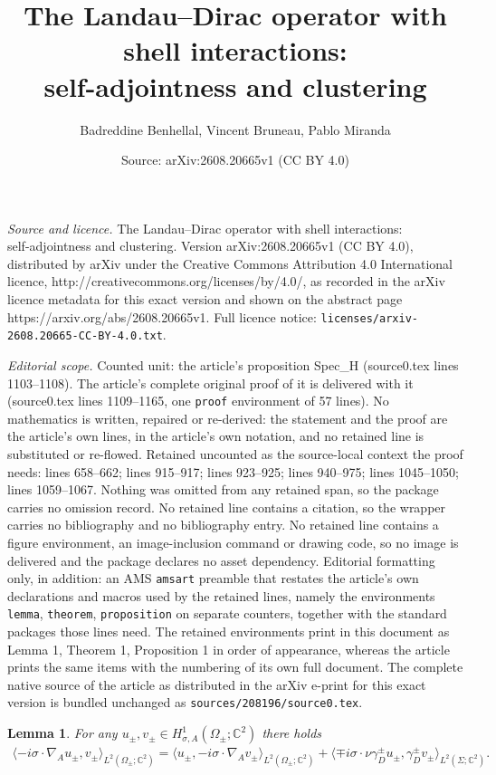 \documentclass[10pt,a4paper]{amsart}
\title{The Landau--Dirac operator with shell interactions: \\self-adjointness and clustering}
\author{Badreddine Benhellal, Vincent Bruneau, Pablo Miranda}
\date{Source: arXiv:2608.20665v1 (CC BY 4.0)}
\newtheorem{lemma}{Lemma}
\def \cc {{\mathbb C}}
\begin{document}
\maketitle

\noindent\emph{Source and licence.} The Landau--Dirac operator with shell interactions: \\self-adjointness and clustering. Version arXiv:2608.20665v1 (CC BY 4.0), distributed by arXiv under the Creative Commons Attribution 4.0 International licence, http://creativecommons.org/licenses/by/4.0/, as recorded in the arXiv licence metadata for this exact version and shown on the abstract page https://arxiv.org/abs/2608.20665v1. Full licence notice: \texttt{licenses/arxiv-2608.20665-CC-BY-4.0.txt}.\par\smallskip

\noindent\textit{Editorial scope.} Counted unit: the article's proposition Spec\_H (source0.tex lines 1103--1108). The article's complete original proof of it is delivered with it (source0.tex lines 1109--1165, one \texttt{proof} environment of 57 lines). No mathematics is written, repaired or re-derived: the statement and the proof are the article's own lines, in the article's own notation, and no retained line is substituted or re-flowed.  Retained uncounted as the source-local context the proof needs: lines 658--662; lines 915--917; lines 923--925; lines 940--975; lines 1045--1050; lines 1059--1067.  Nothing was omitted from any retained span, so the package carries no omission record.  No retained line contains a citation, so the wrapper carries no bibliography and no bibliography entry.  No retained line contains a figure environment, an image-inclusion command or drawing code, so no image is delivered and the package declares no asset dependency.  Editorial formatting only, in addition: an AMS \texttt{amsart} preamble that restates the article's own declarations and macros used by the retained lines, namely the environments \texttt{lemma}, \texttt{theorem}, \texttt{proposition} on separate counters, together with the standard packages those lines need.  The retained environments print in this document as Lemma 1, Theorem 1, Proposition 1 in order of appearance, whereas the article prints the same items with the numbering of its own full document.  The complete native source of the article as distributed in the arXiv e-print for this exact version is bundled unchanged as \texttt{sources/208196/source0.tex}.
\begin{lemma}\label{Green} For any $u_\pm,v_\pm\in  H^1_{\sigma, A}(\Omega_\pm;\cc^2)$ there holds 
      \begin{align*}
    \langle -i\sigma\cdot\nabla_A u_\pm, v_\pm \rangle_{L^2(\Omega_\pm;\cc^2)}=\langle u_\pm, -i\sigma\cdot\nabla_A v_\pm \rangle_{L^2(\Omega_\pm;\cc^2)}+\langle \mp i\sigma\cdot\nu\gamma_D^\pm u_\pm, \gamma_D^\pm v_\pm \rangle_{L^2(\Sigma;\cc^2)}.
\end{align*}
\end{lemma}
\end{document}
